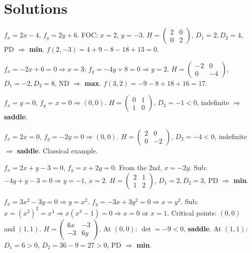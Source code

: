 \section{Solutions}

\begin{solutions}
    \item $f_x = 2 x - 4$, $f_y = 2 y + 6$. FOC: $x = 2$, $y = -3$. $H = \begin{pmatrix} 2 & 0 \\ 0 & 2 \end{pmatrix}$, $D_1 = 2, D_2 = 4$, PD $\Rightarrow$ \textbf{min}. $f(2, -3) = 4 + 9 - 8 - 18 + 13 = 0$.
    \item $f_x = -2 x + 6 = 0 \Rightarrow x = 3$; $f_y = -4 y + 8 = 0 \Rightarrow y = 2$. $H = \begin{pmatrix} -2 & 0 \\ 0 & -4 \end{pmatrix}$, $D_1 = -2, D_2 = 8$, ND $\Rightarrow$ \textbf{max}. $f(3, 2) = -9 - 8 + 18 + 16 = 17$.
    \item $f_x = y = 0$, $f_y = x = 0 \Rightarrow (0, 0)$. $H = \begin{pmatrix} 0 & 1 \\ 1 & 0 \end{pmatrix}$, $D_2 = -1 < 0$, indefinite $\Rightarrow$ \textbf{saddle}.
    \item $f_x = 2 x = 0$, $f_y = -2 y = 0 \Rightarrow (0, 0)$. $H = \begin{pmatrix} 2 & 0 \\ 0 & -2 \end{pmatrix}$, $D_2 = -4 < 0$, indefinite $\Rightarrow$ \textbf{saddle}. Classical example.
    \item $f_x = 2 x + y - 3 = 0$, $f_y = x + 2 y = 0$. From the 2nd, $x = -2 y$. Sub: $-4 y + y - 3 = 0 \Rightarrow y = -1$, $x = 2$. $H = \begin{pmatrix} 2 & 1 \\ 1 & 2 \end{pmatrix}$, $D_1 = 2, D_2 = 3$, PD $\Rightarrow$ \textbf{min}.
    \item $f_x = 3 x^2 - 3 y = 0 \Rightarrow y = x^2$. $f_y = -3 x + 3 y^2 = 0 \Rightarrow x = y^2$. Sub: $x = (x^2)^2 = x^4 \Rightarrow x(x^3 - 1) = 0 \Rightarrow x = 0$ or $x = 1$. Critical points: $(0, 0)$ and $(1, 1)$. $H = \begin{pmatrix} 6 x & -3 \\ -3 & 6 y \end{pmatrix}$. At $(0,0)$: $\det = -9 < 0$, \textbf{saddle}. At $(1, 1)$: $D_1 = 6 > 0$, $D_2 = 36 - 9 = 27 > 0$, PD $\Rightarrow$ \textbf{min}.

\end{solutions}
